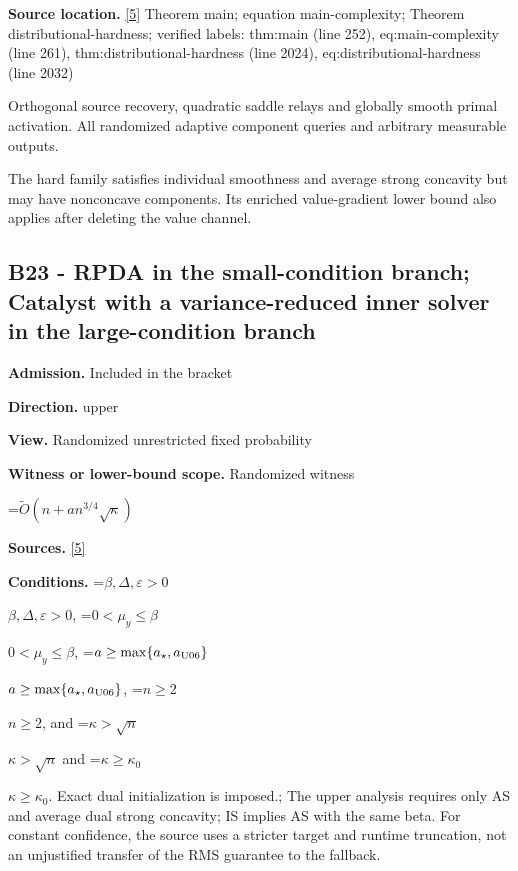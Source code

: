\documentclass[10pt,a4paper]{article}
\newcommand{\AtlasMath}[1]{\par\begingroup\centering\setbox0=\hbox{$\displaystyle #1$}\ifdim\wd0>1.4\linewidth\typeout{ATLAS WIDE FORMULA: \the\wd0}\fi\ifdim\wd0>\linewidth\resizebox{\linewidth}{!}{\box0}\else\box0\fi\par\endgroup}
\newcommand{\AtlasInlineMath}[1]{\begingroup\setbox0=\hbox{$#1$}\ifdim\wd0>.4\linewidth\endgroup\AtlasMath{#1}\else\endgroup$#1$\fi}
\begin{document}
\textbf{Source location.} \href{https://github.com/WU-Wendao/Colombo/blob/main/colombo_sensorium/Complexity_altas/data/sources/colombo/U06/manuscript.pdf}{[5]} Theorem main; equation main-complexity; Theorem distributional-hardness; verified labels: thm:main (line 252), eq:main-complexity (line 261), thm:distributional-hardness (line 2024), eq:distributional-hardness (line 2032)



Orthogonal source recovery, quadratic saddle relays and globally smooth primal activation. All randomized adaptive component queries and arbitrary measurable outputs.



The hard family satisfies individual smoothness and average strong concavity but may have nonconcave components. Its enriched value-gradient lower bound also applies after deleting the value channel.



\subsection{B23 - RPDA in the small-condition branch; Catalyst with a variance-reduced inner solver in the large-condition branch}


\textbf{Admission.} Included in the bracket



\textbf{Direction.} upper



\textbf{View.} Randomized unrestricted fixed probability



\textbf{Witness or lower-bound scope.} Randomized witness



\AtlasMath{\widetilde O(n+a n^{3/4}\sqrt\kappa)}


\textbf{Sources.} \href{https://github.com/WU-Wendao/Colombo/blob/main/colombo_sensorium/Complexity_altas/data/sources/colombo/U06/manuscript.pdf}{[5]}



\textbf{Conditions.} \AtlasInlineMath{\beta,\Delta,\varepsilon>0}, \AtlasInlineMath{0<\mu_y\le\beta}, \AtlasInlineMath{a\ge\max\{a_\star,a_{\rm U06}\}}, \AtlasInlineMath{n\ge2}, and \AtlasInlineMath{\kappa>\sqrt n} and \AtlasInlineMath{\kappa\ge\kappa_0}. Exact dual initialization is imposed.; The upper analysis requires only AS and average dual strong concavity; IS implies AS with the same beta. For constant confidence, the source uses a stricter target and runtime truncation, not an unjustified transfer of the RMS guarantee to the fallback.
\end{document}
